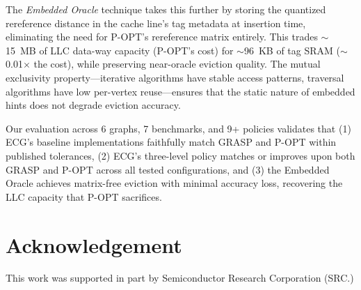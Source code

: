 \documentclass[conference]{IEEEtran}
\begin{document}
The \emph{Embedded Oracle} technique takes this further by storing the quantized rereference distance in the cache line's tag metadata at insertion time, eliminating the need for P-OPT's rereference matrix entirely. This trades $\sim$15~MB of LLC data-way capacity (P-OPT's cost) for $\sim$96~KB of tag SRAM ($\sim$0.01$\times$ the cost), while preserving near-oracle eviction quality. The mutual exclusivity property---iterative algorithms have stable access patterns, traversal algorithms have low per-vertex reuse---ensures that the static nature of embedded hints does not degrade eviction accuracy.

Our evaluation across 6 graphs, 7 benchmarks, and 9+ policies validates that (1) ECG's baseline implementations faithfully match GRASP and P-OPT within published tolerances, (2) ECG's three-level policy matches or improves upon both GRASP and P-OPT across all tested configurations, and (3) the Embedded Oracle achieves matrix-free eviction with minimal accuracy loss, recovering the LLC capacity that P-OPT sacrifices.

\section{Acknowledgement}
This work was supported in part by Semiconductor Research Corporation (SRC.)



\end{document}
